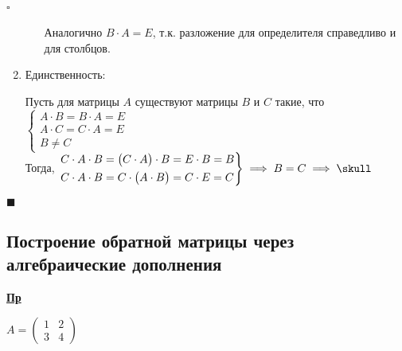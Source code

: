 \documentclass[12pt, a4paper]{report}
\newcommand{\ex}{\begin{flushleft}\textbf{\underline{Пр}}\end{flushleft}}
\newenvironment{proof}{\paragraph{\(\square\)}}{\hfill\(\blacksquare\)}
\begin{document}
\begin{proof}
\begin{enumerate}[1)]
\begin{itemize}
			Аналогично \(B\cdot A=E\), т.к. разложение для определителя справедливо и для столбцов.
			\end{itemize}
		\item Единственность:
		
			 Пусть для матрицы \(A\) существуют матрицы \(B\) и \(C\) такие, что \(\begin{cases}A\cdot B=B\cdot A = E\\A\cdot C=C\cdot A= E\\ B\neq C\end{cases}\)\\
			Тогда, \(\begin{rcases}C\cdot A\cdot B=\big(C\cdot A\big)\cdot B=E\cdot B=B\\C\cdot A\cdot B=C\cdot\big(A\cdot B\big)=C\cdot E= C\end{rcases}\implies B=C\implies\skull\)
		\end{enumerate}
	\end{proof}
	\subsection{Построение обратной матрицы через алгебраические дополнения}
	\ex
	
	\(A=\begin{pmatrix}1&2\\3&4\end{pmatrix}\)
	
\end{document}
